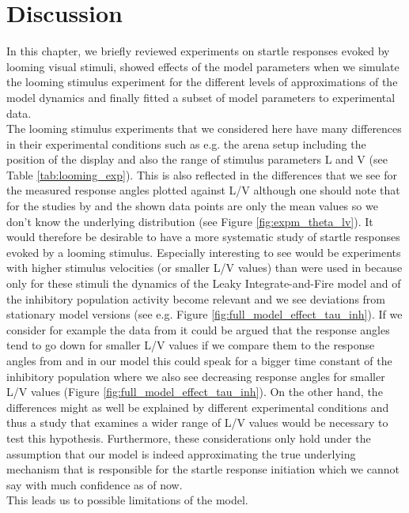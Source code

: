     \section{Discussion}
    In this chapter, we briefly reviewed experiments on startle responses evoked by looming visual stimuli, showed effects of the model parameters when we simulate the looming stimulus experiment for the different levels of approximations of the model dynamics and finally fitted a subset of model parameters to experimental data.\\
    The looming stimulus experiments that we considered here have many differences in their experimental conditions such as e.g. the arena setup including the position of the display and also the range of stimulus parameters L and V (see Table \ref{tab:looming_exp}).
    This is also reflected in the differences that we see for the measured response angles plotted against L/V although one should note that for the studies by \cite{Dunn2016} and \cite{Preuss2006} the shown data points are only the mean values so we don't know the underlying distribution (see Figure \ref{fig:expm_theta_lv}).
    It would therefore be desirable to have a more systematic study of startle responses evoked by a looming stimulus.
    Especially interesting to see would be experiments with higher stimulus velocities (or smaller L/V values) than were used in \cite{Bhattacharyya2017} because only for these stimuli the dynamics of the Leaky Integrate-and-Fire model and of the inhibitory population activity become relevant and we see deviations from stationary model versions (see e.g. Figure \ref{fig:full_model_effect_tau_inh}).
    If we consider for example the data from \cite{Temizer2015} it could be argued that the response angles tend to go down for smaller L/V values if we compare them to the response angles from \cite{Bhattacharyya2017} and in our model this could speak for a bigger time constant of the inhibitory population where we also see decreasing response angles for smaller L/V values (Figure \ref{fig:full_model_effect_tau_inh}).
    On the other hand, the differences might as well be explained by different experimental conditions and thus a study that examines a wider range of L/V values would be necessary to test this hypothesis.
    Furthermore, these considerations only hold under the assumption that our model is indeed approximating the true underlying mechanism that is responsible for the startle response initiation which we cannot say with much confidence as of now.\\
    This leads us to possible limitations of the model.
